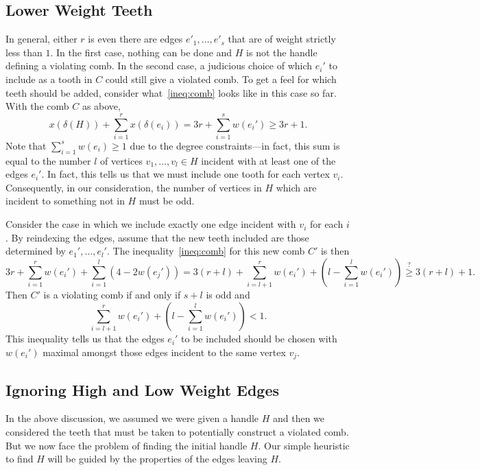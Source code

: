 \documentclass[11pt, letterpaper]{amsart}
\theoremstyle{plain}
\theoremstyle{definition}
\theoremstyle{remark}
\begin{document}
\subsection{Lower Weight Teeth}
In general, either $r$ is even there are edges $e'_1,\ldots,e'_s$ that are of
weight strictly less than $1$. In the first case, nothing can be done and $H$
is not the handle defining a violating comb. In the second case, a judicious
choice of which $e_i'$ to include as a tooth in $C$ could still give a violated
comb. To get a feel for which teeth should be added, consider what~\eqref{ineq:comb} looks
like in this case so far. With the comb $C$ as above,
\begin{equation*}
  x(\delta(H)) + \sum^r_{i = 1}x(\delta(e_i)) = 3r + \sum^s_{i = 1}w(e_i') \geq 3r + 1.
\end{equation*}
Note that $\sum^s_{i = 1}w(e_i) \geq 1$ due to the degree constraints---in
fact, this sum is equal to the number $l$ of vertices $v_1,\ldots,v_l \in H$
incident with at least one of the edges $e_i'$. In fact, this tells us that we
must include one tooth for each vertex $v_i$. Consequently, in our
consideration, the number of vertices in $H$ which are incident to something
not in $H$ must be odd.

Consider the case in which we include exactly one edge incident with $v_i$ for
each $i$. By reindexing the edges, assume that the new teeth included are those
determined by $e_1',\ldots,e_l'$. The inequality~\eqref{ineq:comb} for this new comb $C'$
is then
\begin{equation*}
  3r + \sum^r_{i = 1} w(e_i') + \sum^l_{i = 1}(4 - 2w(e_j')) = 3(r+l) + \sum^r_{i = l+1}w(e_i') + \left(l - \sum^l_{i = 1}w(e_i')\right) \stackrel{?}{\geq} 3(r+l) + 1.
\end{equation*}
Then $C'$ is a violating comb if and only if $s + l$ is odd and
\begin{equation}\label{ineq:2}
  \sum^r_{i = l+1} w(e_i') + \left(l - \sum^l_{i = 1}w(e_i')\right) < 1.
\end{equation}
This inequality tells us that the edges $e_i'$ to be included should be chosen
with $w(e_i')$ maximal amongst those edges incident to the same vertex $v_j$.


\subsection{Ignoring High and Low Weight Edges}
In the above discussion, we assumed we were given a handle $H$ and then we
considered the teeth that must be taken to potentially construct a violated
comb.  But we now face the problem of finding the initial handle $H$. Our
simple heuristic to find $H$ will be guided by the properties of the edges
leaving $H$.
\end{document}
